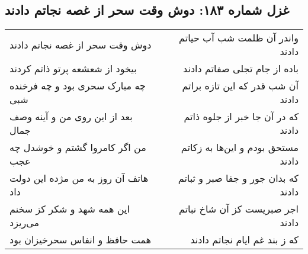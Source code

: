 \begin{center}
\section*{غزل شماره ۱۸۳: دوش وقت سحر از غصه نجاتم دادند}
\label{sec:sh183}
\begin{longtable}{l p{0.5cm} r}
دوش وقت سحر از غصه نجاتم دادند
&&
واندر آن ظلمت شب آب حیاتم دادند
\\
بیخود از شعشعه پرتو ذاتم کردند
&&
باده از جام تجلی صفاتم دادند
\\
چه مبارک سحری بود و چه فرخنده شبی
&&
آن شب قدر که این تازه براتم دادند
\\
بعد از این روی من و آینه وصف جمال
&&
که در آن جا خبر از جلوه ذاتم دادند
\\
من اگر کامروا گشتم و خوشدل چه عجب
&&
مستحق بودم و این‌ها به زکاتم دادند
\\
هاتف آن روز به من مژده این دولت داد
&&
که بدان جور و جفا صبر و ثباتم دادند
\\
این همه شهد و شکر کز سخنم می‌ریزد
&&
اجر صبریست کز آن شاخ نباتم دادند
\\
همت حافظ و انفاس سحرخیزان بود
&&
که ز بند غم ایام نجاتم دادند
\\
\end{longtable}
\end{center}
